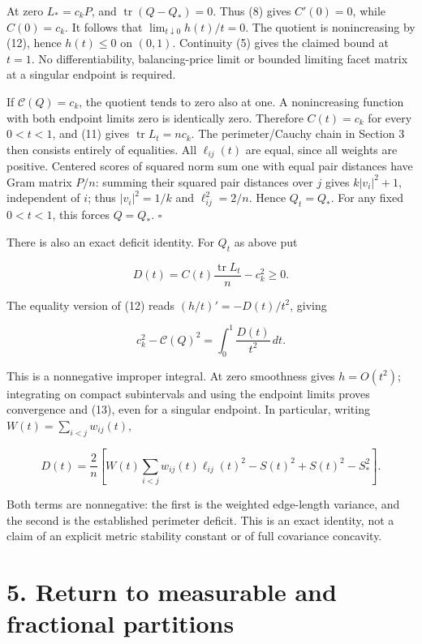 \documentclass[
  11pt,
]{article}
\begin{document}
At zero \(L_*=c_kP\), and \(\operatorname{tr}(Q-Q_*)=0\). Thus (8) gives
\(C'(0)=0\), while \(C(0)=c_k\). It follows that
\(\lim_{t\downarrow0}h(t)/t=0\). The quotient is nonincreasing by (12),
hence \(h(t)\le0\) on \((0,1)\). Continuity (5) gives the claimed bound
at \(t=1\). No differentiability, balancing-price limit or bounded
limiting facet matrix at a singular endpoint is required.

If \(\mathcal C(Q)=c_k\), the quotient tends to zero also at one. A
nonincreasing function with both endpoint limits zero is identically
zero. Therefore \(C(t)=c_k\) for every \(0<t<1\), and (11) gives
\(\operatorname{tr}L_t=nc_k\). The perimeter/Cauchy chain in Section 3
then consists entirely of equalities. All \(\ell_{ij}(t)\) are equal,
since all weights are positive. Centered scores of squared norm sum one
with equal pair distances have Gram matrix \(P/n\): summing their
squared pair distances over \(j\) gives \(k|v_i|^2+1\), independent of
\(i\); thus \(|v_i|^2=1/k\) and \(\ell_{ij}^2=2/n\). Hence \(Q_t=Q_*\).
For any fixed \(0<t<1\), this forces \(Q=Q_*\). \(\square\)

There is also an exact deficit identity. For \(Q_t\) as above put

\[
 D(t)=C(t)\frac{\operatorname{tr}L_t}{n}-c_k^2\ge0.
\]

The equality version of (12) reads \((h/t)'=-D(t)/t^2\), giving

\[
 c_k^2-\mathcal C(Q)^2=\int_0^1\frac{D(t)}{t^2}\,dt.     \tag{13}
\]

This is a nonnegative improper integral. At zero smoothness gives
\(h=O(t^2)\); integrating on compact subintervals and using the endpoint
limits proves convergence and (13), even for a singular endpoint. In
particular, writing \(W(t)=\sum_{i<j}w_{ij}(t)\),

\[
 D(t)=\frac2n\left[
   W(t)\sum_{i<j}w_{ij}(t)\ell_{ij}(t)^2-S(t)^2
                         +S(t)^2-S_*^2\right].           \tag{14}
\]

Both terms are nonnegative: the first is the weighted edge-length
variance, and the second is the established perimeter deficit. This is
an exact identity, not a claim of an explicit metric stability constant
or of full covariance concavity.

\section{5. Return to measurable and fractional
partitions}\label{return-to-measurable-and-fractional-partitions}
\end{document}

